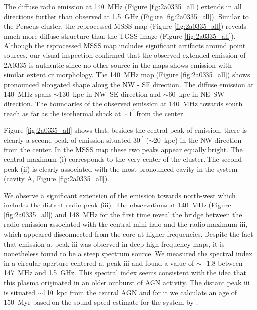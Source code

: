 \documentclass{aa}  %
\begin{document}
The diffuse radio emission at 140~MHz (Figure \ref{fig:2a0335_all}) extends in all directions further than observed at 1.5~GHz (Figure \ref{fig:2a0335_all}).
Similar to the Perseus cluster, the reprocessed MSSS map (Figure \ref{fig:2a0335_all}) reveals much more diffuse structure than the TGSS image (Figure \ref{fig:2a0335_all}).
Although the reprocessed MSSS map includes significant artifacts around point sources, our visual inspection confirmed that the observed extended emission of 2A0335 is authentic since no other source in the maps shows emission with similar extent or morphology.
The 140~MHz map (Figure \ref{fig:2a0335_all}) shows pronounced elongated shape along the NW - SE direction.
The diffuse emission at 140~MHz spans $\sim$130~kpc in NW--SE direction and $\sim$60~kpc in NE--SW direction. %
The boundaries of the observed emission at 140~MHz towards south reach as far as the isothermal shock at $\sim1^{\prime}$ from the center.

Figure \ref{fig:2a0335_all} shows that, besides the central peak of emission, there is clearly a second peak of emission situated $30^{\prime\prime}$ ($\sim$20~kpc) in the NW direction from the center.
In the MSSS map these two peaks appear equally bright.
The central maximum (i) corresponds to the very center of the cluster.
The second peak (ii) is clearly associated with the most pronounced cavity in the system (cavity A, Figure \ref{fig:2a0335_all}). 

We observe a significant extension of the emission towards north-west which includes the distant radio peak (iii).
The observations at 140~MHz (Figure \ref{fig:2a0335_all}) and 148~MHz  for the first time reveal the bridge between the radio emission associated with the central mini-halo and the radio maximum iii, which appeared disconnected from the core at higher frequencies.
Despite the fact that emission at peak iii was observed in deep high-frequency maps, it is nonetheless found to be a steep spectrum source.
We measured the spectral index in a circular aperture centered at peak iii and found a value of $\sim -1.8$ between 147~MHz and 1.5~GHz. 
This spectral index seems consistent with the idea that this plasma originated in an older outburst of AGN activity.
The distant peak iii is situated $\sim$110~kpc from the central AGN and for it we calculate an age of 150~Myr based on the sound speed estimate for the system by \cite{Birzan2004}.
\end{document}
